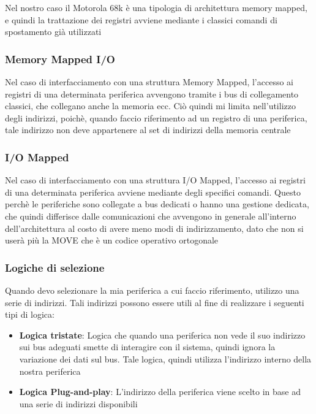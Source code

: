 Nel nostro caso il Motorola 68k è una tipologia di architettura memory mapped, e quindi la trattazione dei registri avviene mediante i classici comandi di spostamento già utilizzati

\subsubsection{Memory Mapped I/O}
Nel caso di interfacciamento con una struttura Memory Mapped, l'accesso ai registri di una determinata periferica avvengono tramite i bus di collegamento classici, che collegano anche la memoria ecc. Ciò quindi mi limita nell'utilizzo degli indirizzi, poichè, quando faccio riferimento ad un registro di una periferica, tale indirizzo non deve appartenere al set di indirizzi della memoria centrale

\subsubsection{I/O Mapped}
Nel caso di interfacciamento con una struttura I/O Mapped, l'accesso ai registri di una determinata periferica avviene mediante degli specifici comandi. Questo perchè le periferiche sono collegate a bus dedicati o hanno una gestione dedicata, che quindi differisce dalle comunicazioni che avvengono in generale all'interno dell'architettura al costo di avere meno modi di indirizzamento, dato che non si userà più la MOVE che è un codice operativo ortogonale

\subsubsection{Logiche di selezione}
Quando devo selezionare la mia periferica a cui faccio riferimento, utilizzo una serie di indirizzi. Tali indirizzi possono essere utili al fine di realizzare i seguenti tipi di logica:
\begin{itemize}
    \item \textbf{Logica tristate}: Logica che quando una periferica non vede il suo indirizzo sui bus adeguati smette di interagire con il sistema, quindi ignora la variazione dei dati sul bus. Tale logica, quindi utilizza l'indirizzo interno della nostra periferica
    \item \textbf{Logica Plug-and-play}: L'indirizzo della periferica viene scelto in base ad una serie di indirizzi disponibili
\end{itemize}

